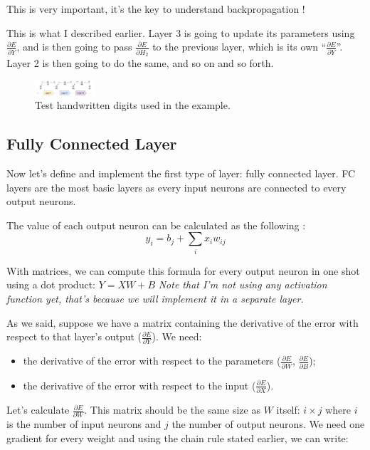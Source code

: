 This is very important, it’s the key to understand backpropagation ! 

This is what I described earlier. Layer 3 is going to update its parameters using $\frac{\partial E}{\partial Y}$, and is then going to pass $\frac{\partial E}{\partial H_2}$ to the previous layer, which is its own “$\frac{\partial E}{\partial Y}$”. Layer 2 is then going to do the same, and so on and so forth.

\begin{figure}[htb]
	\centering
	\includegraphics[width=0.2\textwidth]{figures/backpropagation_from_scratch}
	\caption{Test handwritten digits used in the example.}
	\label{fig:backpropagation_from_scratch}
\end{figure}

\subsection{Fully Connected Layer}
Now let's define and implement the first type of layer: fully connected layer. FC layers are the most basic layers as every input neurons are connected to every output neurons.

The value of each output neuron can be calculated as the following :
\begin{equation}
y_i = b_j + \sum_i x_i w_{ij}
\end{equation}

With matrices, we can compute this formula for every output neuron in one shot using a dot product: $Y=XW+B$
\emph{Note that I’m not using any activation function yet, that’s because we will implement it in a separate layer.}

As we said, suppose we have a matrix containing the derivative of the error with respect to that layer’s output ($\frac{\partial E}{\partial Y}$). We need:
\begin{itemize}
\item the derivative of the error with respect to the parameters ($\frac{\partial E}{\partial W}$, $\frac{\partial E}{\partial B}$);
\item the derivative of the error with respect to the input ($\frac{\partial E}{\partial X}$).
\end{itemize}

Let's calculate $\frac{\partial E}{\partial W}$. This matrix should be the same size as $W$ itself: $i\times j$ where $i$ is the number of input neurons and $j$ the number of output neurons. We need one gradient for every weight and using the chain rule stated earlier, we can write:

